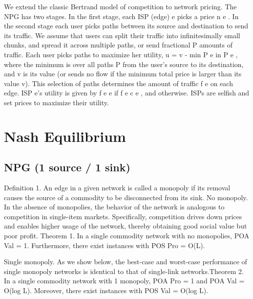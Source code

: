 \documentclass{beamer}
\begin{document}
\begin{frame}
We extend the classic Bertrand model of competition to network pricing. The
NPG has two stages. In the first stage, each ISP (edge) e picks a price n e . In the
second stage each user picks paths between its source and destination to send
its traffic. We assume that users can split their traffic into infinitesimally small
chunks, and spread it across multiple paths, or send fractional
P amounts of traffic.
Each user picks paths to maximize her utility, u = v - min P e in P e , where the
minimum is over all paths P from the user’s source to its destination, and v is
its value (or sends no flow if the minimum total price is larger than its value v).
This selection of paths determines the amount of traffic f e on each edge. ISP e’s
utility is given by f e e if f e  c e , and  otherwise. ISPs are selfish and set
prices to maximize their utility.
\end{frame}


\section{Nash Equilibrium}

\subsection{NPG (1 source / 1 sink)}

\begin{frame}
Definition 1. An edge in a given network is called a monopoly if its removal
causes the source of a commodity to be disconnected from its sink.
No monopoly. In the absence of monopolies, the behavior of the network is
analogous to competition in single-item markets. Specifically, competition drives
down prices and enables higher usage of the network, thereby obtaining good
social value but poor profit.
Theorem 1. In a single commodity network with no monopolies, POA Val = 1.
Furthermore, there exist instances with POS Pro = O(L).
\end{frame}



\begin{frame}
Single monopoly. As we show below, the best-case and worst-case performance
of single monopoly networks is identical to that of single-link networks.Theorem 2. In a single commodity network with 1 monopoly, POA Pro = 1 and
POA Val = O(log L). Moreover, there exist instances with POS Val = O(log L).
\end{frame}
\end{document}
